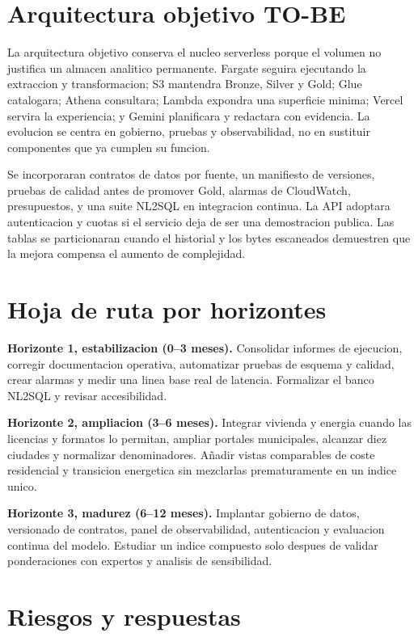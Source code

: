 \section{Arquitectura objetivo TO-BE}

La arquitectura objetivo conserva el nucleo serverless porque el volumen no justifica un almacen analitico permanente. Fargate seguira ejecutando la extraccion y transformacion; S3 mantendra Bronze, Silver y Gold; Glue catalogara; Athena consultara; Lambda expondra una superficie minima; Vercel servira la experiencia; y Gemini planificara y redactara con evidencia. La evolucion se centra en gobierno, pruebas y observabilidad, no en sustituir componentes que ya cumplen su funcion.

Se incorporaran contratos de datos por fuente, un manifiesto de versiones, pruebas de calidad antes de promover Gold, alarmas de CloudWatch, presupuestos, y una suite NL2SQL en integracion continua. La API adoptara autenticacion y cuotas si el servicio deja de ser una demostracion publica. Las tablas se particionaran cuando el historial y los bytes escaneados demuestren que la mejora compensa el aumento de complejidad.

\section{Hoja de ruta por horizontes}

\textbf{Horizonte 1, estabilizacion (0--3 meses).} Consolidar informes de ejecucion, corregir documentacion operativa, automatizar pruebas de esquema y calidad, crear alarmas y medir una linea base real de latencia. Formalizar el banco NL2SQL y revisar accesibilidad.

\textbf{Horizonte 2, ampliacion (3--6 meses).} Integrar vivienda y energia cuando las licencias y formatos lo permitan, ampliar portales municipales, alcanzar diez ciudades y normalizar denominadores. Añadir vistas comparables de coste residencial y transicion energetica sin mezclarlas prematuramente en un indice unico.

\textbf{Horizonte 3, madurez (6--12 meses).} Implantar gobierno de datos, versionado de contratos, panel de observabilidad, autenticacion y evaluacion continua del modelo. Estudiar un indice compuesto solo despues de validar ponderaciones con expertos y analisis de sensibilidad.

\section{Riesgos y respuestas}

